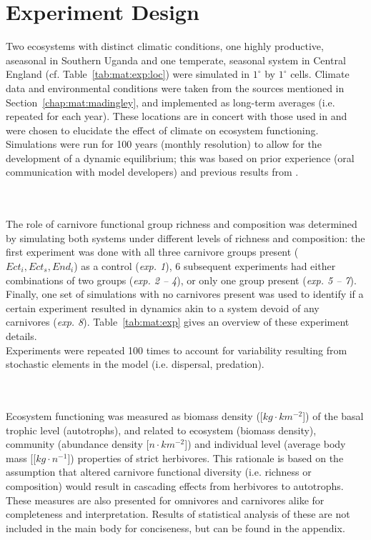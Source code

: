 \section{Experiment Design}
\label{chap:mat:exp}
Two ecosystems with distinct climatic conditions, one highly productive, aseasonal in Southern Uganda and one temperate, seasonal system in Central England (cf. Table~\ref{tab:mat:exp:loc}) were simulated in $1^\circ$ by $1^\circ$ cells. Climate data and environmental conditions were taken from the sources mentioned in Section~\ref{chap:mat:madingley}, and implemented as long-term averages (i.e. repeated for each year).
These locations are in concert with those used in \citet{Harfoot2014} and were chosen to elucidate the effect of climate on ecosystem functioning. \\
Simulations were run for 100 years (monthly resolution) to allow for the development of a dynamic equilibrium; 
this was based on prior experience (oral communication with model developers) and previous results from \cite{Harfoot2014}.

\\\\
The role of carnivore functional group richness and composition was determined by simulating both systems under different levels of richness and composition: 
the first experiment was done with all three carnivore groups present ($Ect_i, Ect_s, End_i$) as a control (\textit{exp. 1}), 6 subsequent experiments had either combinations of two groups (\textit{exp. 2 -- 4}), or only one group present (\textit{exp. 5 -- 7}). 
Finally, one set of simulations with no carnivores present was used to identify if a certain experiment resulted in dynamics akin to a system devoid of any carnivores (\textit{exp. 8}). Table~\ref{tab:mat:exp} gives an overview of these experiment details. \\
Experiments were repeated 100 times to account for variability resulting from stochastic elements in the model (i.e. dispersal, predation).

\\\\
Ecosystem functioning was measured as biomass density ([$kg\cdot km^{-2}$]) of the basal trophic level (autotrophs), and related to ecosystem (biomass density), community (abundance density [$n\cdot km^{-2}$]) and individual level (average body mass [[$kg\cdot n^{-1}$]) properties of strict herbivores. This rationale is based on the assumption that altered carnivore functional diversity (i.e. richness or composition) would result in cascading effects from herbivores to autotrophs. These measures are also presented for omnivores and carnivores alike for completeness and interpretation. Results of statistical analysis of these are not included in the main body for conciseness, but can be found in the appendix.
%
